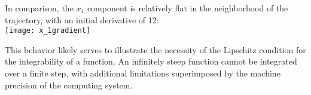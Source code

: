 \documentclass{article}
\begin{document}
	In comparison, the $x_1$ component is relatively flat in the
	neighborhood of the trajectory, with an initial derivative of 12:\\
	\texttt{[image: x\_1gradient]}
	
	This behavior likely serves to illustrate the necessity of the Lipschitz
	condition for the integrability of a function. An infinitely steep
	function cannot be integrated over a finite step, with additional
	limitations superimposed by the machine precision of the computing
	system.
\end{document}
